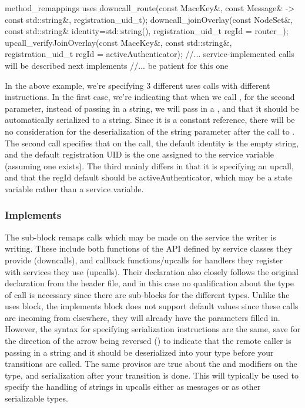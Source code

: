 \begin{programlisting}
method_remappings {
  uses {
    downcall_route(const MaceKey&, const Message& -> const std::string&, registration_uid_t);
    downcall_joinOverlay(const NodeSet&, const std::string& identity=std::string(), registration_uid_t regId = router_);
    upcall_verifyJoinOverlay(const MaceKey&, const std::string&, registration_uid_t regId = activeAuthenticator);
  }
  //... service-implemented calls will be described next
  implements {
    //... be patient for this one
  }
}
\end{programlisting}

In the above example, we're specifying 3 different uses calls with
different instructions.  In the first case, we're indicating that when
we call , for the second parameter, instead
of passing in a string, we will pass in a ,
and that it should be automatically serialized to a string.  Since it
is a constant reference, there will be no consideration for the
deserialization of the string parameter after the call to
.  The second call specifies that on the
 call, the default identity is the
empty string, and the default registration UID is the one assigned to
the  service variable (assuming one exists).
The third mainly differs in that it is specifying an upcall, and that
the regId default should be activeAuthenticator, which may be a state
variable rather than a service variable.


\subsubsection*{Implements}

The  sub-block remaps calls which may be made on the
service the writer is writing.  These include both functions of the API defined
by service classes they provide (downcalls), and callback functions/upcalls for
handlers they register with services they use (upcalls).  Their declaration
also closely follows the original declaration from the header file, and in this
case no qualification about the type of call is necessary since there are
sub-blocks for the different types.  Unlike the uses block, the implements
block does not support default values since these calls are incoming
from elsewhere, they will already have the parameters filled in.  However, the
syntax for specifying serialization instructions are the same, save for the
direction of the arrow being reversed (\symbolkw{<-}) to indicate that the
remote caller is passing in a string and it should be deserialized into your
type before your transitions are called.  The same provisos are true about the
 and \symbolkw{\&} modifiers on the type, and serialization
after your transition is done.  This will typically be used to specify the
handling of strings in upcalls either as messages or as other serializable
types.

